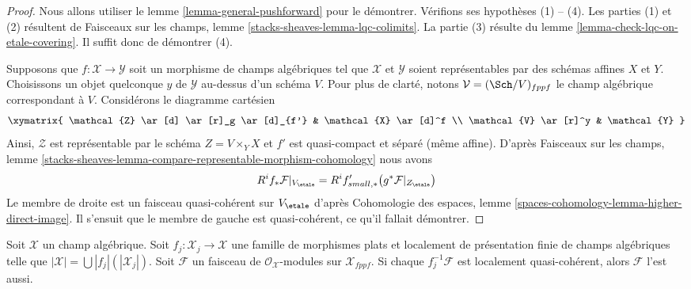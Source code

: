 \begin{proof}
Nous allons utiliser le
lemme \ref{lemma-general-pushforward}
pour le démontrer. Vérifions ses hypothèses (1) -- (4).
Les parties (1) et (2) résultent de
Faisceaux sur les champs, lemme \ref{stacks-sheaves-lemma-lqc-colimits}.
La partie (3) résulte du
lemme \ref{lemma-check-lqc-on-etale-covering}.
Il suffit donc de démontrer (4).

\medskip\noindent
Supposons que $f : \mathcal{X} \to \mathcal{Y}$ soit un morphisme de champs algébriques
tel que $\mathcal{X}$ et $\mathcal{Y}$ soient représentables par des schémas
affines $X$ et $Y$. Choisissons un objet quelconque $y$ de $\mathcal{Y}$ au-dessus d'un
schéma $V$. Pour plus de clarté, notons $\mathcal{V} = (\Sch/V)_{fppf}$ le
champ algébrique correspondant à $V$. Considérons le diagramme cartésien
$$
\xymatrix{
\mathcal{Z} \ar[d] \ar[r]_g \ar[d]_{f'} & \mathcal{X} \ar[d]^f \\
\mathcal{V} \ar[r]^y & \mathcal{Y}
}
$$
Ainsi, $\mathcal{Z}$ est représentable par le schéma $Z = V \times_Y X$
et $f'$ est quasi-compact et séparé (même affine). D'après
Faisceaux sur les champs, lemme
\ref{stacks-sheaves-lemma-compare-representable-morphism-cohomology}
nous avons
$$
R^if_*\mathcal{F}|_{V_\etale} =
R^if'_{small, *}\big(g^*\mathcal{F}|_{Z_\etale}\big)
$$
Le membre de droite est un faisceau quasi-cohérent sur $V_\etale$ d'après
Cohomologie des espaces, lemme
\ref{spaces-cohomology-lemma-higher-direct-image}.
Il s'ensuit que le membre de gauche est quasi-cohérent, ce qu'il
fallait démontrer.
\end{proof}

\begin{lemma}
\label{lemma-check-lqc-on-flat-covering}
Soit $\mathcal{X}$ un champ algébrique. Soit
$f_j : \mathcal{X}_j \to \mathcal{X}$ une famille de morphismes plats
et localement de présentation finie de champs algébriques telle que
$|\mathcal{X}| =\bigcup |f_j|(|\mathcal{X}_j|)$.
Soit $\mathcal{F}$ un faisceau de $\mathcal{O}_\mathcal{X}$-modules
sur $\mathcal{X}_{fppf}$. Si chaque $f_j^{-1}\mathcal{F}$
est localement quasi-cohérent, alors $\mathcal{F}$ l'est aussi.
\end{lemma}


